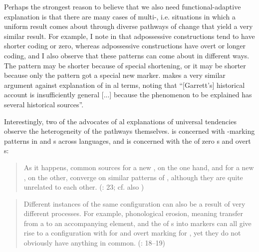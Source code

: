 \documentclass[output=paper]{langsci/langscibook}
\begin{document}
Perhaps the strongest reason to believe that we also need functional-adaptive explanation is that there are many cases of multi-, i.e. situations in which a uniform result comes about through diverse pathways of change that yield a very similar result. For example, I note in \citet{Haspelmath2017} that  adpossessive constructions tend to have shorter coding or zero, whereas  adpossessive constructions have overt or longer coding, and I also observe that these patterns can come about in different ways. The  pattern may be shorter because of special shortening, or it may be shorter because only the  pattern got a special new marker. \citet[37]{Kiparsky2008} makes a very similar argument against  explanation of  in al terms, noting that “[Garrett’s] historical account is insufficiently general [...] because the phenomenon to be explained has several historical sources”.

Interestingly, two of the advocates of al explanations of universal tendencies observe the heterogeneity of the pathways themselves. \citet{Anderson2016} is concerned with -marking patterns in  and  s across languages, and \citet{Cristofaro2017} is concerned with the  of zero s and overt s:


\begin{quote}
As it happens, common sources for a new , on the one hand, and for a new , on the other, converge on similar patterns of , although they are quite unrelated to each other. (\citealt{Anderson2016}: 23; cf. also \citealt{Anderson1977})
\end{quote}

\begin{quote}
Different instances of the same configuration can also be a result of very different processes. For example, phonological erosion, meaning transfer from a  to an accompanying element, and the  of s into  markers can all give rise to a configuration with  for  and overt marking for , yet they do not obviously have anything in common. (\citealt{Cristofaro2017}: 18–19)
\end{quote}
\end{document}
